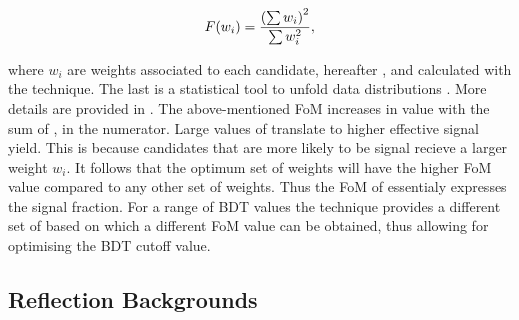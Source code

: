\begin{equation}
  \centering
  F(w_i) = \frac{\left(\sum{w_{i}}\right)^2}{\sum{w_{i}^2}},
\label{eqn:fom}
\end{equation}

\noindent where $w_i$ are weights associated to each candidate, hereafter \sWeights, and calculated with the
\sPlot technique. The last  is a statistical tool to unfold data distributions \cite{splot}. More details
are provided in . The above-mentioned FoM increases in value with the sum of
\sWeights, in the numerator. Large values of \sWeights translate to higher effective signal yield. This is
because candidates that are more likely to be signal recieve a larger weight $w_i$. It follows that the
optimum set of weights will have the higher FoM value compared to any other set of weights. Thus the FoM
of  essentialy expresses the signal fraction. For a range of BDT values the \sPlot technique
provides a different set of \sWeights based on which a different FoM value can be obtained, thus allowing for
optimising the BDT cutoff value.

\subsection{Reflection Backgrounds}
\label{peaking_backgrounds}

